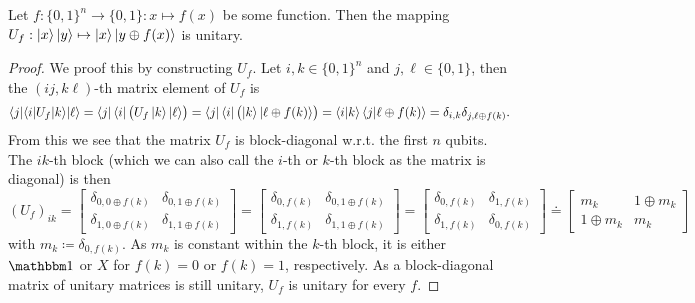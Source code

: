 			\begin{theorem}
				Let \( f : \{ 0, 1 \}^n \to \{ 0, 1 \} : x \mapsto f(x) \) be some function. Then the mapping \( U_f : \ket{x}\ket{y} \mapsto \ket{x}\ket{y \oplus f(x)} \) is unitary.
			\end{theorem}
			\begin{proof}
				We proof this by constructing \(U_f\). Let \( i, k \in \{ 0, 1 \}^n \) and \( j, \ell \in \{ 0, 1 \} \), then the \( (ij, k\ell) \)-th matrix element of \(U_f\) is
				\begin{equation}
					\bra{j}\!\!\mel{i}{U_f}{k}\!\ket{\ell}
					= \bra{j} \bra{i} \bigl( U_f \ket{k} \ket{\ell} \bigr)
					= \bra{j} \bra{i} \bigl( \ket{k} \ket{\ell \oplus f(k)} \bigr)
					= \braket{i}{k} \braket{j}{\ell \oplus f(k)}
					= \delta_{i, k} \delta_{j, \ell \oplus f(k)}.
				\end{equation}
				From this we see that the matrix \(U_f\) is block-diagonal w.r.t. the first \(n\) qubits. The \(ik\)-th block (which we can also call the \(i\)-th or \(k\)-th block as the matrix is diagonal) is then
				\begin{equation}
					(U_f)_{ik}
					=
					\begin{bmatrix}
						\delta_{0, 0 \oplus f(k)} & \delta_{0, 1 \oplus f(k)} \\
						\delta_{1, 0 \oplus f(k)} & \delta_{1, 1 \oplus f(k)}
					\end{bmatrix}
					=
					\begin{bmatrix}
						\delta_{0, f(k)} & \delta_{0, 1 \oplus f(k)} \\
						\delta_{1, f(k)} & \delta_{1, 1 \oplus f(k)}
					\end{bmatrix}
					=
					\begin{bmatrix}
						\delta_{0, f(k)} & \delta_{1, f(k)} \\
						\delta_{1, f(k)} & \delta_{0, f(k)}
					\end{bmatrix}
					\doteq
					\begin{bmatrix}
						m_k          & 1 \oplus m_k \\
						1 \oplus m_k & m_k
					\end{bmatrix}
				\end{equation}
				with \( m_k \coloneqq \delta_{0, f(k)} \). As \(m_k\) is constant within the \(k\)-th block, it is either \(\ID\) or \(X\) for \(f(k) = 0\) or \(f(k) = 1\), respectively. As a block-diagonal matrix of unitary matrices is still unitary, \(U_f\) is unitary for every \(f\).
			\end{proof}

